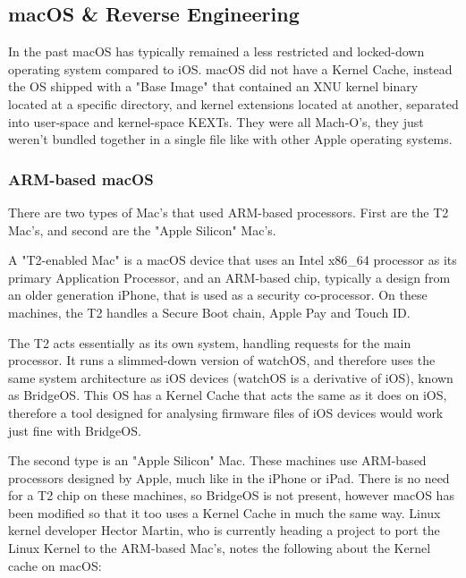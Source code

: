 \subsection{macOS \& Reverse Engineering}


In the past macOS has typically remained a less restricted and locked-down operating system compared to iOS. macOS did not have a Kernel Cache, instead the OS shipped with a "Base Image" that contained an XNU kernel binary located at a specific directory, and kernel extensions located at another, separated into user-space and kernel-space KEXTs. They were all Mach-O's, they just weren't bundled together in a single file like with other Apple operating systems.


\subsubsection{ARM-based macOS}

There are two types of Mac's that used ARM-based processors. First are the T2 Mac's, and second are the "Apple Silicon" Mac's.

A "T2-enabled Mac" is a macOS device that uses an Intel x86\_64 processor as its primary Application Processor, and an ARM-based chip, typically a design from an older generation iPhone, that is used as a security co-processor. On these machines, the T2 handles a Secure Boot chain, Apple Pay and Touch ID. \cite{duo-labs-t2-intro}

The T2 acts essentially as its own system, handling requests for the main processor. It runs a slimmed-down version of watchOS, and therefore uses the same system architecture as iOS devices (watchOS is a derivative of iOS), known as BridgeOS. This OS has a Kernel Cache that acts the same as it does on iOS, therefore a tool designed for analysing firmware files of iOS devices would work just fine with BridgeOS.

The second type is an "Apple Silicon" Mac. These machines use ARM-based processors designed by Apple, much like in the iPhone or iPad. There is no need for a T2 chip on these machines, so BridgeOS is not present, however macOS has been modified so that it too uses a Kernel Cache in much the same way. Linux kernel developer Hector Martin, who is currently heading a project to port the Linux Kernel to the ARM-based Mac's, notes the following about the Kernel cache on macOS:

